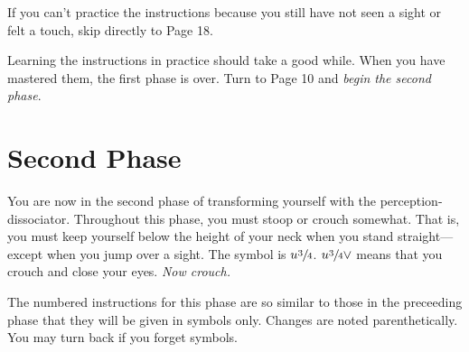\vfill
If you can't practice the instructions because you still have not seen a 
sight or felt a touch, skip directly to Page 18. 

\vfill

Learning the instructions in practice should take a good while. When 
you have mastered them, the first phase is over. Turn to Page 10 and \textit{begin the second phase}.

\vfill

\clearpage


\section{Second Phase}

\vfill
You are now in the second phase of transforming yourself with the 
perception-dissociator. Throughout this phase, you must stoop or crouch 
somewhat. That is, you must keep yourself below the height of your neck 
when you stand straight---except when you jump over a sight. The symbol is 
$u\sfrac{3}{4}$. $u\sfrac{3}{4}\mathord{\vee}$ means that you crouch and close your eyes. \emph{Now crouch.}

The numbered instructions for this phase are so similar to those in the 
preceeding phase that they will be given in symbols only. Changes are noted 
parenthetically. You may turn back if you forget symbols. 

